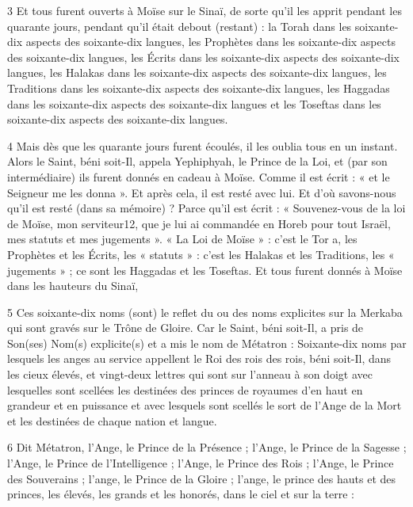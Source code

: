 \par 3 Et tous furent ouverts à Moïse sur le Sinaï, de sorte qu'il les apprit pendant les quarante jours, pendant qu'il était debout (restant) : la Torah dans les soixante-dix aspects des soixante-dix langues, les Prophètes dans les soixante-dix aspects des soixante-dix langues, les Écrits dans les soixante-dix aspects des soixante-dix langues, les Halakas dans les soixante-dix aspects des soixante-dix langues, les Traditions dans les soixante-dix aspects des soixante-dix langues, les Haggadas dans les soixante-dix aspects des soixante-dix langues et les Toseftas dans les soixante-dix aspects des soixante-dix langues.

\par 4 Mais dès que les quarante jours furent écoulés, il les oublia tous en un instant. Alors le Saint, béni soit-Il, appela Yephiphyah, le Prince de la Loi, et (par son intermédiaire) ils furent donnés en cadeau à Moïse. Comme il est écrit : « et le Seigneur me les donna ». Et après cela, il est resté avec lui. Et d'où savons-nous qu'il est resté (dans sa mémoire) ? Parce qu'il est écrit : « Souvenez-vous de la loi de Moïse, mon serviteur12, que je lui ai commandée en Horeb pour tout Israël, mes statuts et mes jugements ». « La Loi de Moïse » : c'est le Tor a, les Prophètes et les Écrits, les « statuts » : c'est les Halakas et les Traditions, les « jugements » ; ce sont les Haggadas et les Toseftas. Et tous furent donnés à Moïse dans les hauteurs du Sinaï,

\par 5 Ces soixante-dix noms (sont) le reflet du ou des noms explicites sur la Merkaba qui sont gravés sur le Trône de Gloire. Car le Saint, béni soit-Il, a pris de Son(ses) Nom(s) explicite(s) et a mis le nom de Métatron : Soixante-dix noms par lesquels les anges au service appellent le Roi des rois des rois, béni soit-Il, dans les cieux élevés, et vingt-deux lettres qui sont sur l'anneau à son doigt avec lesquelles sont scellées les destinées des princes de royaumes d'en haut en grandeur et en puissance et avec lesquels sont scellés le sort de l'Ange de la Mort et les destinées de chaque nation et langue.

\par 6 Dit Métatron, l'Ange, le Prince de la Présence ; l'Ange, le Prince de la Sagesse ; l'Ange, le Prince de l'Intelligence ; l'Ange, le Prince des Rois ; l'Ange, le Prince des Souverains ; l'ange, le Prince de la Gloire ; l'ange, le prince des hauts et des princes, les élevés, les grands et les honorés, dans le ciel et sur la terre :

